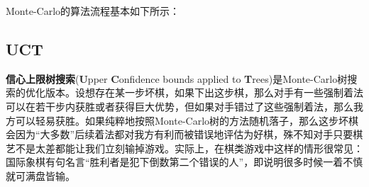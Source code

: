 \documentclass{article}
\begin{document}
	Monte-Carlo的算法流程基本如下所示：
	
	\subsection{UCT}
	
	\textbf{信心上限树搜索}(\textbf{U}pper \textbf{C}onfidence bounds applied to \textbf{T}rees)是Monte-Carlo树搜索的优化版本。设想存在某一步坏棋，如果下出这步棋，那么对手有一些强制着法可以在若干步内获胜或者获得巨大优势，但如果对手错过了这些强制着法，那么我方可以轻易获胜。如果纯粹地按照Monte-Carlo树的方法随机落子，那么这步坏棋会因为“大多数”后续着法都对我方有利而被错误地评估为好棋，殊不知对手只要棋艺不是太差都能让我们立刻输掉游戏。实际上，在棋类游戏中这样的情形很常见：国际象棋有句名言“胜利者是犯下倒数第二个错误的人”，即说明很多时候一着不慎就可满盘皆输。
	
\end{document}
